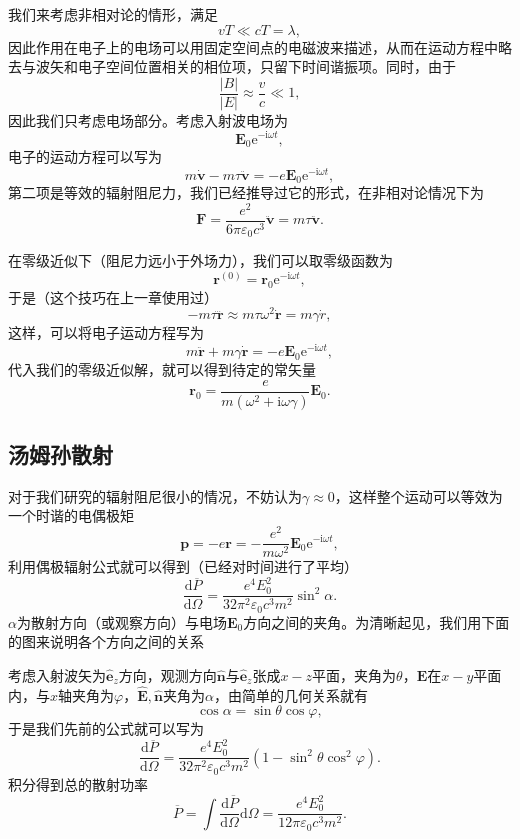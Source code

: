\documentclass[UTF8]{ctexbook}
\newcommand{\e}{\mathrm{e}}
\renewcommand{\d}{\mathrm{d}}
\renewcommand{\b}{\boldsymbol}
\renewcommand{\i}{\mathrm{i}}
\numberwithin{equation}{chapter}
\begin{document}
	我们来考虑非相对论的情形，满足
	\[vT \ll cT = \lambda ,\]
	因此作用在电子上的电场可以用固定空间点的电磁波来描述，从而在运动方程中略去与波矢和电子空间位置相关的相位项，只留下时间谐振项。同时，由于
	\[\frac{|B|}{|E|}\approx\frac{v}{c}\ll 1,\]
	因此我们只考虑电场部分。考虑入射波电场为
	\[\b{E}_0\e^{-\i\omega t},\]
	电子的运动方程可以写为
	\[m\dot{\b{v}}-m\tau\ddot{\b{v}}=-e\b{E}_0\e^{-\i\omega t},\]
	第二项是等效的辐射阻尼力，我们已经推导过它的形式，在非相对论情况下为
	\[\b{F}=\frac{e^2}{6\pi\varepsilon_0c^3}\ddot{\b{v}}=m\tau\ddot{\b{v}}.\]
	
	在零级近似下（阻尼力远小于外场力），我们可以取零级函数为
	\[\b{r}^{(0)}=\b{r}_0\e^{-\i\omega t},\]
	于是（这个技巧在上一章使用过）
	\[-m\tau\dddot{\b{r}}\approx m\tau \omega^2 \dot{\b{r}} = m\gamma \dot{r},\]
	这样，可以将电子运动方程写为
	\[m\ddot{\b{r}}+m\gamma\dot{\b{r}}=-e\b{E}_0\e^{-\i\omega t},\]
	代入我们的零级近似解，就可以得到待定的常矢量
	\[\b{r}_0=\frac{e}{m(\omega^2 + \i\omega \gamma)}\b{E}_0.\]
	
	\subsection{汤姆孙散射}
	
	对于我们研究的辐射阻尼很小的情况，不妨认为$\gamma\approx 0$，这样整个运动可以等效为一个时谐的电偶极矩
	\[\b{p}=-e\b{r}=-\frac{e^2}{m\omega^2}\b{E}_0\e^{-\i\omega t},\]
	利用偶极辐射公式就可以得到（已经对时间进行了平均）
	\[\frac{\d \overline{P}}{\d \Omega}=\frac{e^4 E_0^2}{32\pi^2 \varepsilon_0 c^3 m^2}\sin^2\alpha.\]
	$\alpha$为散射方向（或观察方向）与电场$\b{E}_0$方向之间的夹角。为清晰起见，我们用下面的图来说明各个方向之间的关系
	\begin{figure}[H]
		\centering
	\end{figure}

	考虑入射波矢为$\hat{\b{e}}_z$方向，观测方向$\hat{\b{n}}$与$\hat{\b{e}}_z$张成$x-z$平面，夹角为$\theta$，$\b{E}$在$x-y$平面内，与$x$轴夹角为$\varphi$，$\hat{\b{E}},\hat{\b{n}}$夹角为$\alpha$，由简单的几何关系就有
	\[\cos\alpha=\sin\theta\cos\varphi,\]
	于是我们先前的公式就可以写为
	\[\frac{\d \overline{P}}{\d \Omega}=\frac{e^4E_0^2}{32\pi^2\varepsilon_0c^3m^2}(1-\sin^2\theta\cos^2\varphi).\]
	积分得到总的散射功率
	\[\overline{P}=\int\frac{\d \overline{P}}{\d \Omega}\d \Omega=\frac{e^4 E_0^2}{12\pi\varepsilon_0c^3m^2}.\]
	
\end{document}
